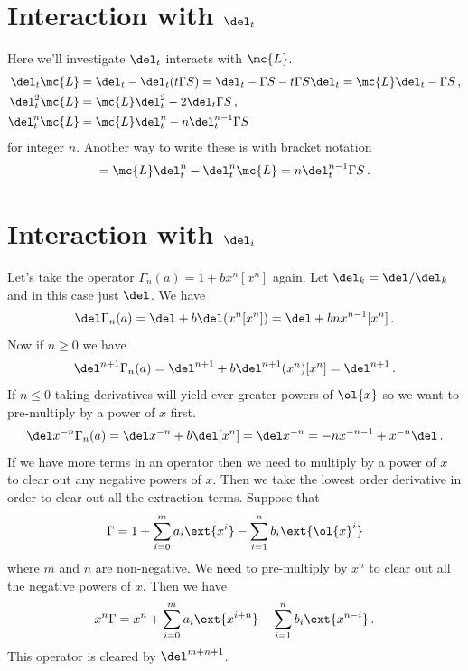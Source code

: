 \section{Interaction with $\del_t$}
Here we'll investigate $\del_t$ interacts with $\mc{L}$.
\begin{align}
	\del_t \mc{L} &= \del_t - \del_t(t\Gamma S) = \del_t - \Gamma S- t\Gamma S\del_t = \mc{L}\del_t - \Gamma S\,,\\
	\del_t^2 \mc{L} &= \mc{L}\del_t^2 - 2\del_t \Gamma S\,,\\
	\del_t^n \mc{L} &=\mc{L} \del_t^n - n\del_t^{n-1}\Gamma S
\end{align}
for integer $n$. Another way to write these is with bracket notation
\begin{align}
	[\mc{L},\del_t^n] = \mc{L}\del_t^n-\del_t^n\mc{L} = n\del_t^{n-1}\Gamma S\,.
\end{align}

\section{Interaction with $\del_i$}
Let's take the operator $\Gamma_n(a) = 1 + b x^n[x^n]$ again. Let $\del_k = \del/\del_k$ and in this case just $\del$. We have
\begin{align}
	\del \Gamma_n(a) = \del + b\del(x^n[x^n]) = \del + bnx^{n-1}[x^n]\,.
\end{align}
Now if $n\ge 0$ we have
\begin{align}
	\del^{n+1}\Gamma_n(a)  = \del^{n+1} + b\del^{n+1}(x^n)[x^n] = \del^{n+1}\,.
\end{align}
If $n\leq 0$ taking derivatives will yield ever greater powers of $\ol{x}$ so we want to pre-multiply by a power of $x$ first.
\begin{align}
	\del x^{-n} \Gamma_{n}(a) = \del x^{-n} + b\del [x^n] = \del x^{-n} = -nx^{-n-1} + x^{-n}\del\,.
\end{align}
If we have more terms in an operator then we need to multiply by a power of $x$ to clear out any negative powers of $x$. Then we take the lowest order derivative in order to clear out all the extraction terms. Suppose that
\begin{align}
	\Gamma = 1 + \sum_{i=0}^{m} a_i \ext{x^i} - \sum_{i=1}^n b_i\ext{\ol{x}^i}
\end{align}
where $m$ and $n$ are non-negative. We need to pre-multiply by $x^n$ to clear out all the negative powers of $x$. Then we have
\begin{align}
	x^n\Gamma = x^n + \sum_{i=0}^{m} a_i \ext{x^{i+n}} - \sum_{i=1}^n b_i\ext{x^{n-i}}\,.
\end{align}
This operator is cleared by $\del^{m+n+1}$.



